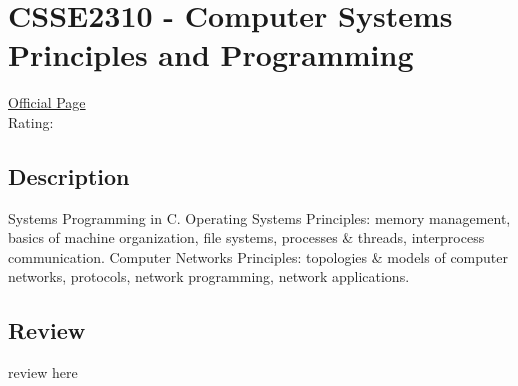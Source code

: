 \hypertarget{CSSE2310}{\section{CSSE2310 - Computer Systems Principles and Programming}}

\large
\textcolor{turbo_purple}{\href{https://my.uq.edu.au/programs-courses/course.html?course_code=CSSE2310}{Official Page}} \\
Rating: \cstar\cstar\cstar\cstar\ostar

\normalsize
\subsection*{Description}
Systems Programming in C.
Operating Systems Principles: memory management, basics of machine organization, file systems, processes \& threads, interprocess communication.
Computer Networks Principles: topologies \& models of computer networks, protocols, network programming, network applications.

\subsection*{Review}
review here
